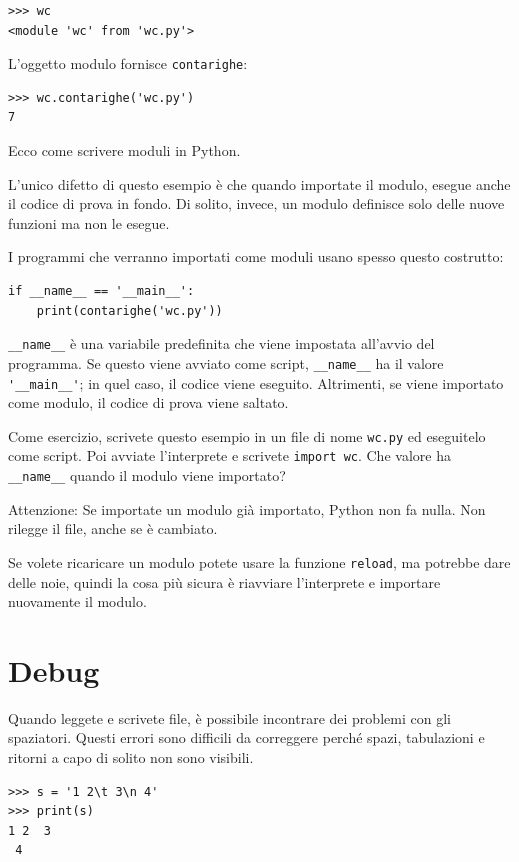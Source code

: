 \documentclass[10pt]{book}
\begin{document}
\begin{verbatim}
>>> wc
<module 'wc' from 'wc.py'>
\end{verbatim}
%
L'oggetto modulo fornisce \verb"contarighe":

\begin{verbatim}
>>> wc.contarighe('wc.py')
7
\end{verbatim}
%
Ecco come scrivere moduli in Python.

L'unico difetto di questo esempio è che quando importate il modulo, esegue anche il codice di prova in fondo. Di solito, invece, un modulo definisce solo delle nuove funzioni ma non le esegue.

I programmi che verranno importati come moduli usano spesso questo costrutto:

\begin{verbatim}
if __name__ == '__main__':
    print(contarighe('wc.py'))
\end{verbatim}
%
\verb"__name__" è una variabile predefinita che viene impostata all'avvio del programma. Se questo viene avviato come script,
\verb"__name__" ha il valore \verb"'__main__'"; in quel caso, il codice viene eseguito. Altrimenti, se viene importato come modulo, il codice di prova viene saltato.

Come esercizio, scrivete questo esempio in un file di nome {\tt wc.py} ed eseguitelo come script. Poi avviate l'interprete e scrivete
{\tt import wc}.  Che valore ha \verb"__name__"
quando il modulo viene importato?

Attenzione: Se importate un modulo già importato, Python non fa nulla. Non rilegge il file, anche se è cambiato.

Se volete ricaricare un modulo potete usare la funzione {\tt reload}, ma potrebbe dare delle noie, quindi la cosa più sicura è riavviare l'interprete e importare nuovamente il modulo.


\section{Debug}

Quando leggete e scrivete file, è possibile incontrare dei problemi con gli spaziatori. Questi errori sono difficili da correggere perché spazi, tabulazioni e ritorni a capo di solito non sono visibili.

\begin{verbatim}
>>> s = '1 2\t 3\n 4'
>>> print(s)
1 2	 3
 4
\end{verbatim}
\end{document}
